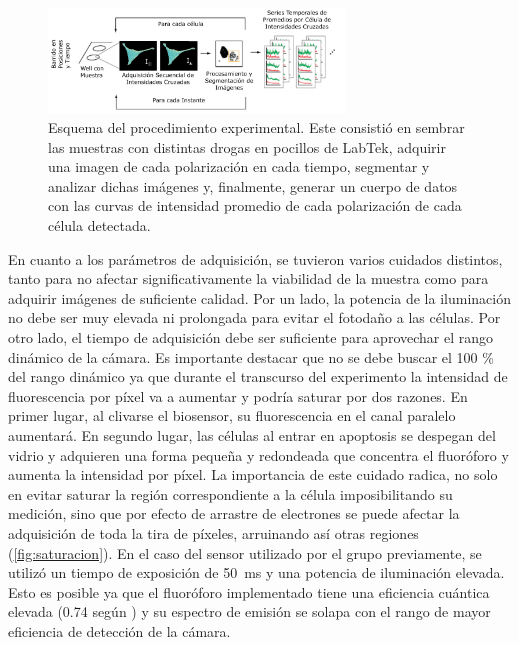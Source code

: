 \begin{figure}
    \centering
    \includegraphics[width=0.7\textwidth]{img/cap_2/ProcedimientoExperimental.pdf}
    \caption{\footnotesize{Esquema del procedimiento experimental. Este consistió en sembrar las muestras con distintas drogas en pocillos de LabTek, adquirir una imagen de cada polarización en cada tiempo, segmentar y analizar dichas imágenes y, finalmente, generar un cuerpo de datos con las curvas de intensidad promedio de cada polarización de cada célula detectada.}}  
    \label{fig:procedimiento_exp}
\end{figure}

En cuanto a los parámetros de adquisición, se tuvieron varios cuidados distintos, tanto para no afectar significativamente la viabilidad de la muestra como para adquirir imágenes de suficiente calidad. Por un lado, la potencia de la iluminación no debe ser muy elevada ni prolongada para evitar el fotodaño a las células. Por otro lado, el tiempo de adquisición debe ser suficiente para aprovechar el rango dinámico de la cámara. Es importante destacar que no se debe buscar el 100 \% del rango dinámico ya que durante el transcurso del experimento la intensidad de fluorescencia por píxel va a aumentar y podría saturar por dos razones. En primer lugar, al clivarse el biosensor, su fluorescencia en el canal paralelo aumentará. En segundo lugar, las células al entrar en apoptosis se despegan del vidrio y adquieren una forma pequeña y redondeada que concentra el fluoróforo y aumenta la intensidad por píxel. La importancia de este cuidado radica, no solo en evitar saturar la región correspondiente a la célula imposibilitando su medición, sino que por efecto de arrastre de electrones se puede afectar la adquisición de toda la tira de píxeles, arruinando así otras regiones (\cref{fig:saturacion}). En el caso del sensor utilizado por el grupo previamente, se utilizó un tiempo de exposición de 50~ms y una potencia de iluminación elevada. Esto es posible ya que el fluoróforo implementado tiene una eficiencia cuántica elevada (0.74 según \cite{Griesbeck2001}) y su espectro de emisión se solapa con el rango de mayor eficiencia de detección de la cámara.

